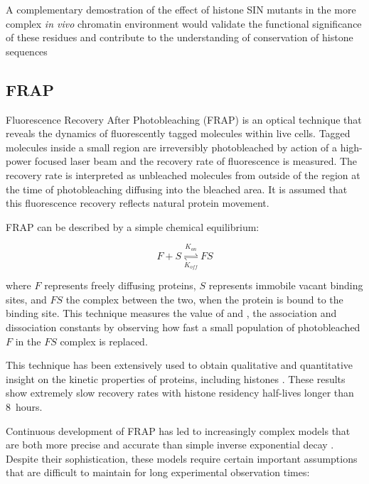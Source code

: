 	A complementary demostration of the effect of histone SIN mutants 
	in the more complex \textit{in vivo} chromatin environment would 
	validate the functional significance of these residues 
	and contribute to the understanding of conservation of histone sequences


  \subsection{FRAP}

    Fluorescence Recovery After Photobleaching (FRAP) is an optical technique
    that reveals the dynamics of fluorescently tagged molecules within live cells.
    Tagged molecules inside a small region are irreversibly photobleached by
    action of a high-power focused laser beam and the recovery rate of fluorescence
    is measured. The recovery rate is interpreted as unbleached molecules 
	from outside of the region at the time of photobleaching diffusing into the bleached area. 
	It is assumed that this fluorescence recovery reflects natural protein movement.

    FRAP can be described by a simple chemical equilibrium:

    \begin{displaymath}
      F + S \overset{K_{on}}{\underset{K_{off}}{\rightleftharpoons}} FS
    \end{displaymath}

    where $F$ represents freely diffusing proteins, $S$ represents immobile vacant
    binding sites, and $FS$ the complex between the two, when the protein is bound
    to the binding site. This technique measures the value of \Kon{} and \Koff{},
    the association and dissociation constants by observing how fast a
    small population of photobleached $F$ in the $FS$ complex is replaced.

    This technique has been extensively used to obtain qualitative and quantitative
    insight on the kinetic properties of proteins, including histones  . 
	These results show extremely slow recovery rates 
	with histone residency half-lives longer than 8~hours.


    Continuous development of FRAP has led to increasingly complex models
    that are both more precise and accurate than simple inverse exponential decay .
    Despite their sophistication, these models require certain important assumptions 
	that are difficult to maintain for long experimental observation times:

